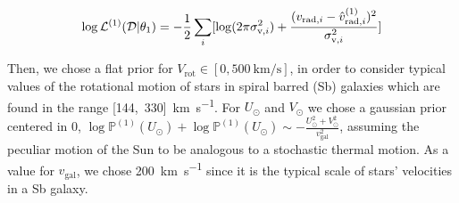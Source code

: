 \begin{equation}\label{Eq:LogLikeMod1}
    \log \mathcal{L}^{(1)}(\mathcal{D} \vert \theta_1) = -\frac{1}{2}\sum_i[\log(2\pi\sigma_{\text{v},i}^2)+\frac{(v_{\text{rad},i} - \hat{v}_{\text{rad},i}^{(1)})^2}{\sigma_{\text{v},i}^2}]
\end{equation}

Then, we chose a flat prior for $V_{\text{rot}}\in[0,\qty{500}{\kilo\meter\per\second}]$, in order to consider typical values of the rotational motion of stars in spiral barred (Sb) galaxies which are found in the range [144,~330]~\unit{\kilo\meter\per\second}\cite{Schneider2015}. 
For $U_\odot$ and $V_\odot$ we chose a gaussian prior centered in 0, $\log\mathbb{P}^{(1)}(U_\odot) + \log\mathbb{P}^{(1)}(U_\odot) \sim - \frac{U_\odot^2 + V_{\odot}^2}{v_{\text{gal}}^2}$, assuming the peculiar motion of the Sun to be analogous to a stochastic thermal motion. 
As a value for $v_{\text{gal}}$, we chose 200~\unit{\kilo\meter\per\second} since it is the typical scale of stars' velocities in a Sb galaxy.

